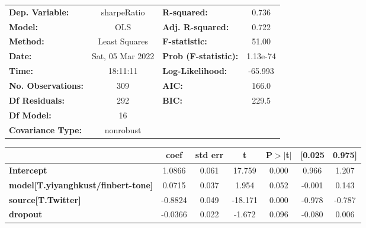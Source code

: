 \begin{center}
\begin{tabular}{lclc}
\toprule
\textbf{Dep. Variable:}                    &   sharpeRatio    & \textbf{  R-squared:         } &     0.736   \\
\textbf{Model:}                            &       OLS        & \textbf{  Adj. R-squared:    } &     0.722   \\
\textbf{Method:}                           &  Least Squares   & \textbf{  F-statistic:       } &     51.00   \\
\textbf{Date:}                             & Sat, 05 Mar 2022 & \textbf{  Prob (F-statistic):} &  1.13e-74   \\
\textbf{Time:}                             &     18:11:11     & \textbf{  Log-Likelihood:    } &   -65.993   \\
\textbf{No. Observations:}                 &         309      & \textbf{  AIC:               } &     166.0   \\
\textbf{Df Residuals:}                     &         292      & \textbf{  BIC:               } &     229.5   \\
\textbf{Df Model:}                         &          16      & \textbf{                     } &             \\
\textbf{Covariance Type:}                  &    nonrobust     & \textbf{                     } &             \\
\bottomrule
\end{tabular}
\begin{tabular}{lcccccc}
                                           & \textbf{coef} & \textbf{std err} & \textbf{t} & \textbf{P$> |$t$|$} & \textbf{[0.025} & \textbf{0.975]}  \\
\midrule
\textbf{Intercept}                         &       1.0866  &        0.061     &    17.759  &         0.000        &        0.966    &        1.207     \\
\textbf{model[T.yiyanghkust/finbert-tone]} &       0.0715  &        0.037     &     1.954  &         0.052        &       -0.001    &        0.143     \\
\textbf{source[T.Twitter]}                 &      -0.8824  &        0.049     &   -18.171  &         0.000        &       -0.978    &       -0.787     \\
\textbf{dropout}                           &      -0.0366  &        0.022     &    -1.672  &         0.096        &       -0.080    &        0.006     \\

\end{tabular}
\end{center}
